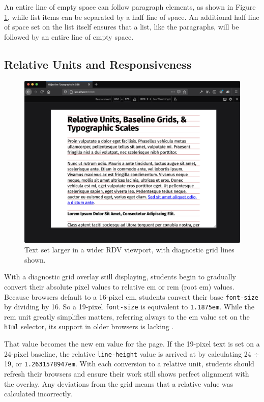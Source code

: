 \documentclass[sigplan,screen]{acmart}
\begin{document}
An entire line of empty space can follow paragraph elements, as shown in Figure \ref{fig:rdv-wide}, while list items can be separated by a half line of space. An additional half line of space set on the list itself ensures that a list, like the paragraphs, will be followed by an entire line of empty space.

\subsection{Relative Units and Responsiveness}

\begin{figure}
  \includegraphics[width=\linewidth]{rdv-wide}
  \caption{Text set larger in a wider RDV viewport, with diagnostic grid lines shown.}
  \label{fig:rdv-wide}
\end{figure}

With a diagnostic grid overlay still displaying, students begin to gradually convert their absolute pixel values to relative em or rem (root em) values. Because browsers default to a 16-pixel em, students convert their base \verb|font-size| by dividing by 16. So a 19-pixel \verb|font-size| is equivalent to \verb|1.1875em|. While the rem unit greatly simplifies matters, referring always to the em value set on the \verb|html| selector, its support in older browsers is lacking \cite{ciu:rem}.

That value becomes the new em value for the page. If the 19-pixel text is set on a 24-pixel baseline, the relative \verb|line-height| value is arrived at by calculating 24 ÷ 19, or \verb|1.2631578947em|. With each conversion to a relative unit, students should refresh their browsers and ensure their work still shows perfect alignment with the overlay. Any deviations from the grid means that a relative value was calculated incorrectly.
\end{document}
